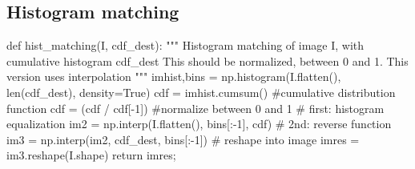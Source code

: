 \subsection{Histogram matching}

\begin{python}
def hist_matching(I, cdf_dest):
    """
    Histogram matching of image I, with cumulative histogram cdf_dest
    This should be normalized, between 0 and 1.
    This version uses interpolation
    """
    imhist,bins = np.histogram(I.flatten(), len(cdf_dest), density=True)
    cdf = imhist.cumsum() #cumulative distribution function
    cdf = (cdf / cdf[-1]) #normalize between 0 and 1
    # first: histogram equalization
    im2 = np.interp(I.flatten(), bins[:-1], cdf)
    # 2nd: reverse function
    im3 = np.interp(im2, cdf_dest, bins[:-1])
    # reshape into image 
    imres = im3.reshape(I.shape)
    return imres;
\end{python}

